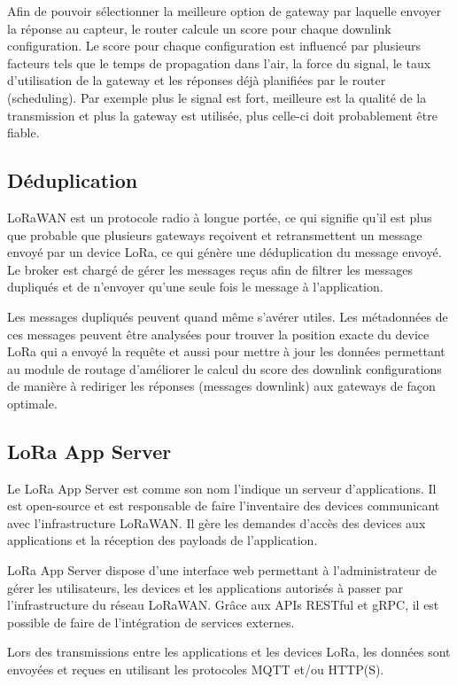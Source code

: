 Afin de pouvoir sélectionner la meilleure option de gateway par laquelle envoyer la réponse au capteur, le router calcule un score pour chaque downlink configuration. Le score pour chaque configuration est influencé par plusieurs facteurs tels que le temps de propagation dans l'air, la force du signal, le taux d'utilisation de la gateway et les réponses déjà planifiées par le router (scheduling). Par exemple plus le signal est fort, meilleure est la qualité de la transmission et plus la gateway est utilisée, plus celle-ci doit probablement être fiable.

\subsection{Déduplication}

LoRaWAN est un protocole radio à longue portée, ce qui signifie qu'il est plus que probable que plusieurs gateways reçoivent et retransmettent un message envoyé par un device LoRa, ce qui génère une déduplication du message envoyé. Le broker est chargé de gérer les messages reçus afin de filtrer les messages dupliqués et de n'envoyer qu'une seule fois le message à l'application.

Les messages dupliqués peuvent quand même s'avérer utiles. Les métadonnées de ces messages peuvent être analysées pour trouver la position exacte du device LoRa qui a envoyé la requête et aussi pour mettre à jour les données permettant au module de routage d'améliorer le calcul du score des downlink configurations de manière à rediriger les réponses (messages downlink) aux gateways de façon optimale.

\subsection{LoRa App Server}

Le LoRa App Server est comme son nom l'indique un serveur d'applications. Il est open-source et est responsable de faire l'inventaire des devices communicant avec l'infrastructure LoRaWAN. Il gère les demandes d'accès des devices aux applications et la réception des payloads de l'application.

LoRa App Server dispose d'une interface web permettant à l'administrateur de gérer les utilisateurs, les devices et les applications autorisés à passer par l'infrastructure du réseau LoRaWAN. Grâce aux APIs RESTful et gRPC, il est possible de faire de l'intégration de services externes.

Lors des transmissions entre les applications et les devices LoRa, les données sont envoyées et reçues en utilisant les protocoles MQTT et/ou HTTP(S).

